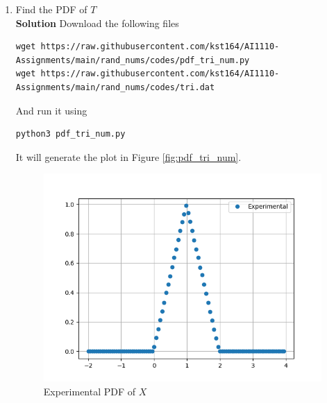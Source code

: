 \documentclass[journal, 12pt, twocolumn]{IEEEtran}
\begin{document}
\begin{enumerate}[label=\arabic{section}.\arabic*]
    \item
        Find the PDF of $T$
        \\
        \textbf{Solution} Download the following files
        \begin{lstlisting}
wget https://raw.githubusercontent.com/kst164/AI1110-Assignments/main/rand_nums/codes/pdf_tri_num.py
wget https://raw.githubusercontent.com/kst164/AI1110-Assignments/main/rand_nums/codes/tri.dat
        \end{lstlisting}
        And run it using
        \begin{lstlisting}
python3 pdf_tri_num.py
        \end{lstlisting}
        It will generate the plot in Figure \eqref{fig:pdf_tri_num}.
        \begin{figure}[!ht]
            \includegraphics[width=\columnwidth]{figs/pdf_tri_num.png}
            \caption{Experimental PDF of $X$}
            \label{fig:pdf_tri_num}
        \end{figure}


\end{enumerate}
\end{document}
